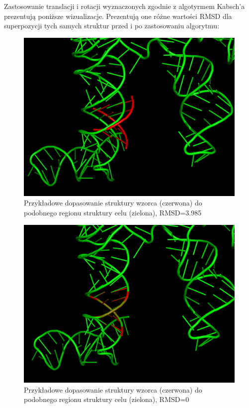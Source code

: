 \documentclass[licencjacka]{pracamgr}
\begin{document}
Zastosowanie translacji i rotacji wyznaczonych zgodnie z algotyrmem Kabsch'a prezentują poniższe wizualizacje. Prezentują one różne wartości RMSD dla superpozycji tych samych struktur przed i po zastosowaniu algorytmu:

\begin{figure}[H]
\centering
\includegraphics[scale=0.2]{rmsd3}
\caption{Przykładowe dopasowanie struktury wzorca (czerwona) do podobnego regionu struktury celu (zielona), RMSD=3.985}
\end{figure}


\begin{figure}[H]
\centering
\includegraphics[scale=0.2]{rmsd0}
\caption{Przykładowe dopasowanie struktury wzorca (czerwona) do podobnego regionu struktury celu (zielona), RMSD=0}
\end{figure}
\end{document}
